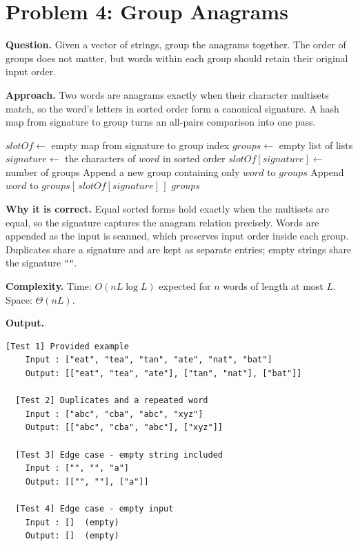 \documentclass[11pt]{article}
\begin{document}
\section*{Problem 4: Group Anagrams}
\textbf{Question.} Given a vector of strings, group the anagrams together. The order of groups does not matter, but words within each group should retain their original input order.

\textbf{Approach.} Two words are anagrams exactly when their character multisets match, so the word's letters in sorted order form a canonical signature. A hash map from signature to group turns an all-pairs comparison into one pass.

\begin{algorithm}[H]
\caption{Group Anagrams}
\begin{algorithmic}[1]
    \State $slotOf \gets$ empty map from signature to group index
    \State $groups \gets$ empty list of lists
        \State $signature \gets$ the characters of $word$ in sorted order
            \State $slotOf[signature] \gets$ number of groups
            \State Append a new group containing only $word$ to $groups$
        \Else
            \State Append $word$ to $groups[\,slotOf[signature]\,]$
        \EndIf
    \EndFor
    \State \Return $groups$
\EndFunction
\end{algorithmic}
\end{algorithm}

\textbf{Why it is correct.} Equal sorted forms hold exactly when the multisets are equal, so the signature captures the anagram relation precisely. Words are appended as the input is scanned, which preserves input order inside each group. Duplicates share a signature and are kept as separate entries; empty strings share the signature \texttt{""}.

\textbf{Complexity.} Time: $O(nL\log L)$ expected for $n$ words of length at most $L$.\\
Space: $\Theta(nL)$.

\textbf{Output.}

\begin{lstlisting}[style=term]
  [Test 1] Provided example
    Input : ["eat", "tea", "tan", "ate", "nat", "bat"]
    Output: [["eat", "tea", "ate"], ["tan", "nat"], ["bat"]]

  [Test 2] Duplicates and a repeated word
    Input : ["abc", "cba", "abc", "xyz"]
    Output: [["abc", "cba", "abc"], ["xyz"]]

  [Test 3] Edge case - empty string included
    Input : ["", "", "a"]
    Output: [["", ""], ["a"]]

  [Test 4] Edge case - empty input
    Input : []  (empty)
    Output: []  (empty)
\end{lstlisting}
\end{document}
